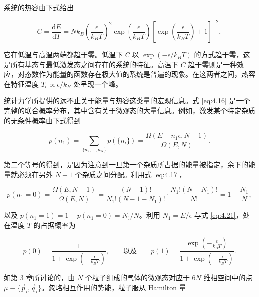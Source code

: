 系统的热容由下式给出

\begin{equation}\label{eq:4.22}
  C=\frac{\mathrm{d}E}{\mathrm{d}T}=Nk_B\left(\frac{\epsilon}{k_BT}\right)^2\exp\left(\frac{\epsilon}{k_BT}\right)\left[\exp\left(\frac{\epsilon}{k_BT}\right)+1\right]^{-2},
\end{equation}


它在低温与高温两端都趋于零。低温下 $C$ 以 $\exp(-\epsilon/k_BT)$ 的方式趋于零，这是所有基态与最低激发态之间存在的系统的特征。高温下 $C$ 趋于零则是一种效应，对态数作为能量的函数存在极大值的系统是普遍的现象。在这两者之间，热容在特征温度 $T_\epsilon\propto\epsilon/k_B$ 处呈现一个峰。


统计力学所提供的远不止关于能量与热容这类量的宏观信息。式 \eqref{eq:4.16} 是一个完整的联合概率分布，其中含有关于微观态的大量信息。例如，激发某个特定杂质的无条件概率由下式得到

\begin{equation}\label{eq:4.23}
  p(n_1)=\sum_{\{n_2,\cdots,n_N\}}p\left(\{n_i\}\right)=\frac{\Omega(E-n_1\epsilon,N-1)}{\Omega(E,N)}.
\end{equation}

第二个等号的得到，是因为注意到一旦第一个杂质所占据的能量被指定，余下的能量就必须在另外 $N-1$ 个杂质之间分配。利用式 \eqref{eq:4.17}，

\begin{equation}\label{eq:4.24}
  p(n_1=0)=\frac{\Omega(E,N-1)}{\Omega(E,N)}=\frac{(N-1)!}{N_1!(N-1-N_1)!}\cdot\frac{N_1!(N-N_1)!}{N!}=1-\frac{N_1}{N},
\end{equation}

以及 $p(n_1=1)=1-p(n_1=0)=N_1/N$。利用 $N_1=E/\epsilon$ 与式 \eqref{eq:4.21}，处在温度 $T$ 的占据概率为

\begin{equation}\label{eq:4.25}
  p(0)=\frac{1}{1+\exp\left(-\frac{\epsilon}{k_BT}\right)},\qquad\text{以及}\qquad
  p(1)=\frac{\exp\left(-\frac{\epsilon}{k_BT}\right)}{1+\exp\left(-\frac{\epsilon}{k_BT}\right)}.
\end{equation}


如第 3 章所讨论的，由 $N$ 个粒子组成的气体的微观态对应于 $6N$ 维相空间中的点 $\mu\equiv\{\vec p_i,\vec q_i\}$。忽略相互作用的势能，粒子服从 Hamilton 量

